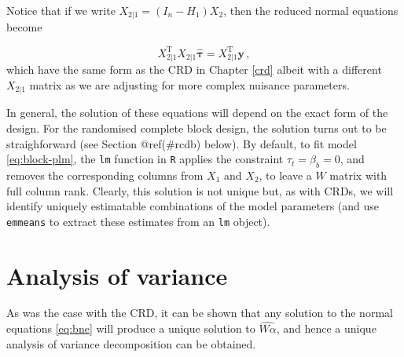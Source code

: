 \documentclass[
]{book}
\newenvironment{Shaded}{\begin{snugshade}}{\end{snugshade}}
\newcommand{\CommentTok}[1]{\textcolor[rgb]{0.56,0.35,0.01}{\textit{#1}}}
\newcommand{\DecValTok}[1]{\textcolor[rgb]{0.00,0.00,0.81}{#1}}
\newcommand{\FunctionTok}[1]{\textcolor[rgb]{0.00,0.00,0.00}{#1}}
\newcommand{\NormalTok}[1]{#1}
\newcommand{\OtherTok}[1]{\textcolor[rgb]{0.56,0.35,0.01}{#1}}
\newcommand{\SpecialCharTok}[1]{\textcolor[rgb]{0.00,0.00,0.00}{#1}}
\theoremstyle{definition}
\theoremstyle{definition}
\theoremstyle{definition}
\theoremstyle{definition}
\theoremstyle{remark}
\begin{document}
\begin{Shaded}
\end{Shaded}

Notice that if we write \(X_{2|1} = (I_n - H_1)X_2\), then the reduced normal equations become

\[
X_{2|1}^{\mathrm{T}}X_{2|1}\hat{\boldsymbol{\tau}} = X_{2|1}^{\mathrm{T}}\boldsymbol{y}\,,
\]
which have the same form as the CRD in Chapter \ref{crd} albeit with a different \(X_{2|1}\) matrix as we are adjusting for more complex nuisance parameters.

In general, the solution of these equations will depend on the exact form of the design. For the randomised complete block design, the solution turns out to be straighforward (see Section @ref(\#rcdb) below). By default, to fit model \eqref{eq:block-plm}, the \texttt{lm} function in \texttt{R} applies the constraint \(\tau_t = \beta_b = 0\), and removes the corresponding columns from \(X_1\) and \(X_2\), to leave a \(W\) matrix with full column rank. Clearly, this solution is not unique but, as with CRDs, we will identify uniquely estimatable combinations of the model parameters (and use \texttt{emmeans} to extract these estimates from an \texttt{lm} object).

\hypertarget{block-anova}{%
\section{Analysis of variance}\label{block-anova}}

As was the case with the CRD, it can be shown that any solution to the normal equations \eqref{eq:bne} will produce a unique solution to \(\widehat{W\alpha}\), and hence a unique analysis of variance decomposition can be obtained.
\end{document}
